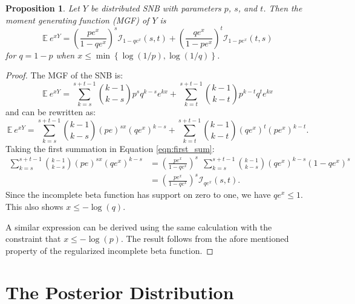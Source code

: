 \documentclass[review]{elsarticle}
\newtheorem{prop}{Proposition}
\begin{document}
\begin{prop} Let $Y$ be distributed SNB with parameters $p$, $s$, and $t$.
Then the moment generating function (MGF) of $Y$ is
\begin{equation} \label{eqn:mgf}
\mathbb{E}~e^{xY} = \left(\frac{p e^x}{1 - qe^x}\right)^s 
  \mathcal{I}_{1-qe^x} (s, t) + \left(\frac{qe^x}{1-pe^x}\right)^t 
  \mathcal{I}_{1-pe^x}(t, s)
\end{equation}
for $q = 1-p$ when $x \leq \min \left\{\log(1/p), \log(1/q) \right\}$.
\end{prop}
\begin{proof}
The MGF of the SNB is:
\begin{equation*}
\mathbb{E}~e^{xY} = \sum_{k=s}^{s+t-1} {k-1 \choose k-s} p^s q^{k-s} e^{kx} 
  + \sum_{k=t}^{s+t-1} {k-1 \choose k-t} p^{k-t} q^t e^{kx}
\end{equation*}
and can be rewritten as:
\begin{equation} \label{eqn:first_sum}
\mathbb{E}~e^{xY} = \sum_{k=s}^{s+t-1}{k-1 \choose k-s} (pe)^{sx} (qe^x)^{k-s} 
  + \sum_{k=t}^{s+t-1}{k-1 \choose k-t} (qe^x)^t (pe^x)^{k-t}.
\end{equation}
Taking the first summation in Equation \ref{eqn:first_sum}:
\begin{align*}
\sum_{k=s}^{s+t-1}{k-1 \choose k-s} (pe)^{sx} (qe^x)^{k-s} &= 
  \left(\frac{pe^x}{1 - qe^x}\right)^s \ \ \sum_{k=s}^{s+t-1} {k-1 \choose k-s} 
    (qe^x)^{k-s} (1-qe^x)^s \\
  &= \left(\frac{pe^x}{1 - qe^x}\right)^s \mathcal{I}_{qe^x}(s, t).
\end{align*}
Since the incomplete beta function has support on zero to one, we have
$qe^x \leq 1$. This also shows $x \leq -\log(q)$.

A similar expression can be derived using the same calculation with
the constraint that $x \leq -\log(p)$. The result
follows from the afore mentioned property of the regularized incomplete
beta function.
\end{proof}

\section{The Posterior Distribution}
\end{document}
